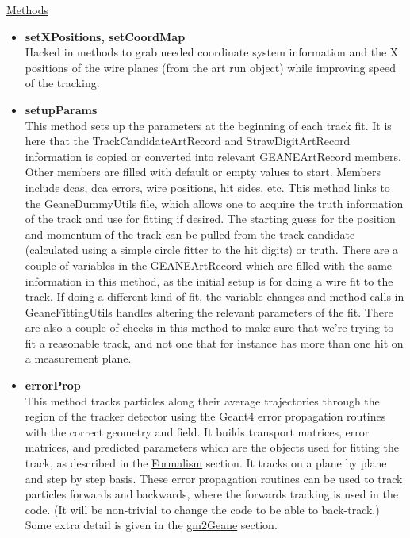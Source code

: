 \begin{enumerate}
      \underline{Methods}

        \begin{itemize}

          \item{\bf{setXPositions, setCoordMap}} \\
          Hacked in methods to grab needed coordinate system information and the X positions of the wire planes (from the art run object) while improving speed of the tracking.

          \item{\bf{setupParams}} \\
          This method sets up the parameters at the beginning of each track fit. It is here that the TrackCandidateArtRecord and StrawDigitArtRecord information is copied or converted into relevant GEANEArtRecord members. Other members are filled with default or empty values to start. Members include dcas, dca errors, wire positions, hit sides, etc. This method links to the GeaneDummyUtils file, which allows one to acquire the truth information of the track and use for fitting if desired. The starting guess for the position and momentum of the track can be pulled from the track candidate (calculated using a simple circle fitter to the hit digits) or truth. There are a couple of variables in the GEANEArtRecord which are filled with the same information in this method, as the initial setup is for doing a wire fit to the track. If doing a different kind of fit, the variable changes and method calls in GeaneFittingUtils handles altering the relevant parameters of the fit. There are also a couple of checks in this method to make sure that we're trying to fit a reasonable track, and not one that for instance has more than one hit on a measurement plane.

          \item{\bf{errorProp}} \\ 
          This method tracks particles along their average trajectories through the region of the tracker detector using the Geant4 error propagation routines with the correct geometry and field. It builds transport matrices, error matrices, and predicted parameters which are the objects used for fitting the track, as described in the \hyperref[sec:Formalism]{Formalism} section. It tracks on a plane by plane and step by step basis. These error propagation routines can be used to track particles forwards and backwards, where the forwards tracking is used in the code. (It will be non-trivial to change the code to be able to back-track.) Some extra detail is given in the \hyperref[sec:gm2Geane]{gm2Geane} section.


\end{itemize}
\end{enumerate}
